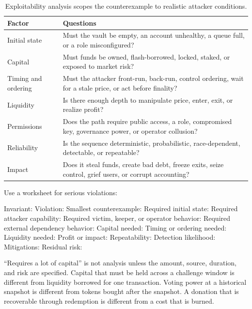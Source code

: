 \begin{table}[htbp]
\centering
\small
\renewcommand{\arraystretch}{1.18}
\begin{tabularx}{\textwidth}{@{}>{\RaggedRight\arraybackslash}p{}X@{}}
\toprule
Factor & Questions \\
\midrule
Initial state & Must the vault be empty, an account unhealthy, a queue full, or a role misconfigured? \\
Capital & Must funds be owned, flash-borrowed, locked, staked, or exposed to market risk? \\
Timing and ordering & Must the attacker front-run, back-run, control ordering, wait for a stale price, or act before finality? \\
Liquidity & Is there enough depth to manipulate price, enter, exit, or realize profit? \\
Permissions & Does the path require public access, a role, compromised key, governance power, or operator collusion? \\
Reliability & Is the sequence deterministic, probabilistic, race-dependent, detectable, or repeatable? \\
Impact & Does it steal funds, create bad debt, freeze exits, seize control, grief users, or corrupt accounting? \\
\bottomrule
\end{tabularx}
\caption{Exploitability analysis scopes the counterexample to realistic attacker conditions.}
\end{table}

Use a worksheet for serious violations:

\begin{codeblock}
Invariant:
Violation:
Smallest counterexample:
Required initial state:
Required attacker capability:
Required victim, keeper, or operator behavior:
Required external dependency behavior:
Capital needed:
Timing or ordering needed:
Liquidity needed:
Profit or impact:
Repeatability:
Detection likelihood:
Mitigations:
Residual risk:
\end{codeblock}

``Requires a lot of capital'' is not analysis unless the amount, source, duration, and risk are specified. Capital that must be held across a challenge window is different from liquidity borrowed for one transaction. Voting power at a historical snapshot is different from tokens bought after the snapshot. A donation that is recoverable through redemption is different from a cost that is burned.

